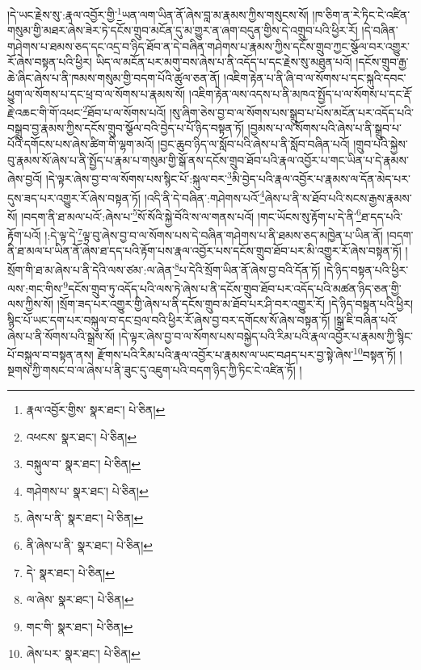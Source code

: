 །དེ་ཡང་རྗེས་སུ་:རྣལ་འབྱོར་གྱི་\footnote{རྣལ་འབྱོར་གྱིས་  སྣར་ཐང་།  པེ་ཅིན། }ཡན་ལག་ཡིན་ནོ་ཞེས་བླ་མ་རྣམས་ཀྱིས་གསུངས་སོ། །ཁ་ཅིག་ན་རེ་ཏིང་ངེ་འཛིན་གསུམ་གྱི་མཐར་ཞེས་ཟེར་ཏེ་དངོས་གྲུབ་མངོན་དུ་མ་གྱུར་ན་ཞག་བདུན་གྱིས་དེ་འགྲུབ་པའི་ཕྱིར་རོ། །དེ་བཞིན་གཤེགས་པ་ཐམས་ཅད་དང་འདྲ་བ་ཉིད་ཐོབ་ན་དེ་བཞིན་གཤེགས་པ་རྣམས་ཀྱིས་དངོས་གྲུབ་ཀྱང་སྩོལ་བར་འགྱུར་རོ་ཞེས་བསྟན་པའི་ཕྱིར། ཡིད་ལ་མངོན་པར་མགུ་བས་ཞེས་པ་ནི་འདོད་པ་དང་རྗེས་སུ་མཐུན་པའོ། །དངོས་གྲུབ་རྒྱ་ཆེ་ཞིང་ཞེས་པ་ནི་ཁམས་གསུམ་གྱི་བདག་པོའི་ཚུལ་ཅན་ནོ། །འཇིག་རྟེན་པ་ནི་ཞི་བ་ལ་སོགས་པ་དང་སྐུའི་དབང་ཕྱུག་ལ་སོགས་པ་དང་ཕྲ་བ་ལ་སོགས་པ་རྣམས་སོ། །འཇིག་རྟེན་ལས་འདས་པ་ནི་མཁའ་སྤྱོད་པ་ལ་སོགས་པ་དང་རྡོ་རྗེ་འཆང་གི་གོ་འཕང་\footnote{འཕངས་  སྣར་ཐང་།  པེ་ཅིན། }ཐོབ་པ་ལ་སོགས་པའོ། །སུ་ཞིག་ཅེས་བྱ་བ་ལ་སོགས་པས་སྒྲུབ་པ་པོས་མངོན་པར་འདོད་པའི་བསྒྲུབ་བྱ་རྣམས་ཀྱིས་དངོས་གྲུབ་སྩོལ་བའི་བྱེད་པ་པོ་ཉིད་བསྟན་ཏོ། །བྱམས་པ་ལ་སོགས་པའི་ཞེས་པ་ནི་སྒྲུབ་པ་པོའི་དགོངས་པས་ཞེས་ཚིག་གི་ལྷག་མའོ། །བྱང་ཆུབ་ཉིད་ལ་སློབ་པའི་ཞེས་པ་ནི་སློབ་བཞིན་པའོ། །གྲུབ་པའི་སྐྱེས་བུ་རྣམས་སོ་ཞེས་པ་ནི་སྤྱོད་པ་རྣམ་པ་གསུམ་གྱི་སྒོ་ནས་དངོས་གྲུབ་ཐོབ་པའི་རྣལ་འབྱོར་པ་གང་ཡིན་པ་དེ་རྣམས་ཞེས་བྱའོ། །དེ་ལྟར་ཞེས་བྱ་བ་ལ་སོགས་པས་སྙིང་པོ་:སྐུལ་བར་\footnote{བསྐུལ་བ་  སྣར་ཐང་།  པེ་ཅིན། }མི་བྱེད་པའི་རྣལ་འབྱོར་པ་རྣམས་ལ་དོན་མེད་པར་དུས་ཟད་པར་འགྱུར་རོ་ཞེས་བསྟན་ཏོ། །འདི་ནི་དེ་བཞིན་:གཤེགས་པའོ་\footnote{གཤེགས་པ་  སྣར་ཐང་།  པེ་ཅིན། }ཞེས་པ་ནི་ས་ཐོབ་པའི་སངས་རྒྱས་རྣམས་སོ། །བདག་ནི་ཐ་མལ་པའོ་:ཞེས་པ་\footnote{ཞེས་པ་ནི་  སྣར་ཐང་།  པེ་ཅིན། }སོ་སོའི་སྐྱེ་བོའི་ས་ལ་གནས་པའོ། །གང་ཡོངས་སུ་རྟོག་པ་དེ་ནི་\footnote{ནི་ཞེས་པ་ནི་  སྣར་ཐང་།  པེ་ཅིན། }ཐ་དད་པའི་རྟོག་པའོ། །:དེ་ལྟ་དེ་\footnote{དེ་  སྣར་ཐང་།  པེ་ཅིན། }ལྟ་བུ་ཞེས་བྱ་བ་ལ་སོགས་པས་དེ་བཞིན་གཤེགས་པ་ནི་ཐམས་ཅད་མཁྱེན་པ་ཡིན་ནོ། །བདག་ནི་ཐ་མལ་པ་ཡིན་ནོ་ཞེས་ཐ་དད་པའི་རྟོག་པས་རྣལ་འབྱོར་པས་དངོས་གྲུབ་ཐོབ་པར་མི་འགྱུར་རོ་ཞེས་བསྟན་ཏོ། །སྲོག་གི་ཐ་མ་ཞེས་པ་ནི་དེའི་ལས་ཙམ་:ལ་ཞེན་\footnote{ལ་ཞེས་  སྣར་ཐང་།  པེ་ཅིན། }པ་དེའི་སྲོག་ཡིན་ནོ་ཞེས་བྱ་བའི་དོན་ཏོ། །དེ་ཉིད་བསྟན་པའི་ཕྱིར་ལས་:གང་གིས་\footnote{གང་གི་  སྣར་ཐང་།  པེ་ཅིན། }དངོས་གྲུབ་ཏུ་འདོད་པའི་ལས་ཏེ་ཞེས་པ་ནི་དངོས་གྲུབ་ཐོབ་པར་འདོད་པའི་མཚན་ཉིད་ཅན་གྱི་ལས་ཀྱིས་སོ། །སྲོག་ཟད་པར་འགྱུར་གྱི་ཞེས་པ་ནི་དངོས་གྲུབ་མ་ཐོབ་པར་ཤི་བར་འགྱུར་རོ། །དེ་ཉིད་བསྟན་པའི་ཕྱིར། སྙིང་པོ་ཡང་དག་པར་བསྐུལ་བ་དང་བྲལ་བའི་ཕྱིར་རོ་ཞེས་བྱ་བར་དགོངས་སོ་ཞེས་བསྟན་ཏོ། །སྒྲ་ཇི་བཞིན་པའོ་ཞེས་པ་ནི་སོགས་པའི་སྒྲས་སོ། །དེ་ལྟར་ཞེས་བྱ་བ་ལ་སོགས་པས་བསྐྱེད་པའི་རིམ་པའི་རྣལ་འབྱོར་པ་རྣམས་ཀྱི་སྙིང་པོ་བསྐུལ་བ་བསྟན་ནས། རྫོགས་པའི་རིམ་པའི་རྣལ་འབྱོར་པ་རྣམས་ལ་ཡང་བཤད་པར་བྱ་སྟེ་ཞེས་\footnote{ཞེས་པར་  སྣར་ཐང་།  པེ་ཅིན། }བསྟན་ཏོ། །སྔགས་ཀྱི་གསང་བ་ལ་ཞེས་པ་ནི་ཟུང་དུ་འཇུག་པའི་བདག་ཉིད་ཀྱི་ཏིང་ངེ་འཛིན་ཏོ། །
